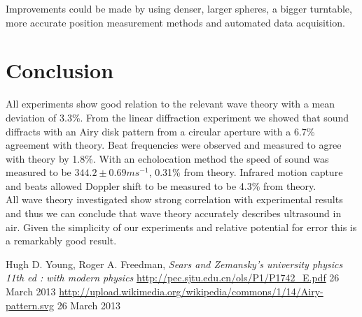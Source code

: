\documentclass[a4paper,10pt,journal]{IEEEtran}
\begin{document}
Improvements could be made by using denser, larger spheres, a bigger turntable, more accurate position measurement methods and automated data acquisition.

\section{Conclusion}

All experiments show good relation to the relevant wave theory with a mean deviation of 3.3\%. From the linear diffraction experiment we showed that sound diffracts with an Airy disk pattern from a circular aperture with a 6.7\% agreement with theory. Beat frequencies were observed and measured to agree with theory by 1.8\%. With an echolocation method the speed of sound was measured to be $344.2 \pm 0.69 ms^{-1}$, 0.31\% from theory. Infrared motion capture and beats allowed Doppler shift to be measured to be 4.3\% from theory.\\
All wave theory investigated show strong correlation with experimental results and thus we can conclude that wave theory accurately describes ultrasound in air. Given the simplicity of our experiments and relative potential for error this is a remarkably good result.


\begin{thebibliography}{9}
Hugh D. Young, Roger A. Freedman, \emph{Sears and Zemansky's university physics 11th ed : with modern physics}
\url{http://pec.sjtu.edu.cn/ols/P1/P1742_E.pdf} 26 March 2013
\url{http://upload.wikimedia.org/wikipedia/commons/1/14/Airy-pattern.svg} 26 March 2013

\end{thebibliography}
\end{document}
